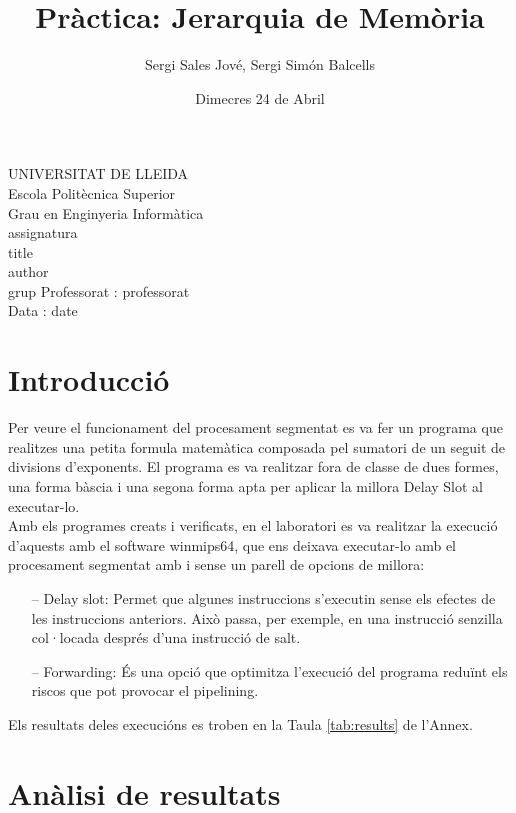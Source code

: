 \documentclass{article}
\title{Pràctica: Jerarquia de Memòria}
\author{Sergi Sales Jové, Sergi Simón Balcells}
\date{Dimecres 24 de Abril}
\renewcommand{\maketitle}{ %
    \begin{titlepage}
        \raggedright{UNIVERSITAT DE LLEIDA \\
            Escola Politècnica Superior \\
            Grau en Enginyeria Informàtica\\
            \1assignatura\\}
            \vspace{5cm}
            \centering\huge{\5title \\}
            \vspace{3cm}
            \large{\6author} \\
            \normalsize{\3grup}
            \vfill
            Professorat : \4professorat \\
            Data : \7date
\end{titlepage}}
\begin{document}
\maketitle
\thispagestyle{empty}

\newpage
{}
\tableofcontents
\listoftables
\newpage
{}
\section{Introducció}
Per veure el funcionament del procesament segmentat es va fer un programa que realitzes una petita formula matemàtica composada pel sumatori de un seguit de divisions d'exponents. El programa es va realitzar fora de classe de dues formes, una forma bàscia i una segona forma apta per aplicar la millora Delay Slot al executar-lo.\\
Amb els programes creats i verificats, en el laboratori es va realitzar la execució d'aquests amb el software winmips64, que ens deixava executar-lo amb el procesament segmentat amb i sense un parell de opcions de millora:
\begin{itemize}
\item[--]{Delay slot:} Permet que algunes instruccions s'executin sense els efectes de les instruccions anteriors. Això passa, per exemple, en una instrucció senzilla col·locada després d'una instrucció de salt.
\item[--]{Forwarding:} És una opció que optimitza l'execució del programa reduïnt els riscos que pot provocar el pipelining.
\end{itemize}
Els resultats deles execucións es troben en la Taula \ref{tab:results} de l'Annex.
\section{Anàlisi de resultats}
\end{document}
